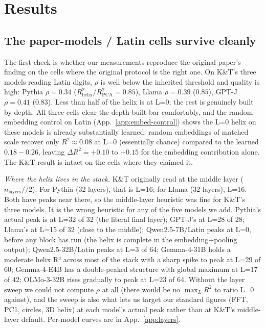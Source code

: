 \documentclass[10pt,letterpaper]{article}
\begin{document}
\section{Results}
\label{sec:results}

\subsection{The paper-models / Latin cells survive cleanly}
\label{sec:results-paper}

The first check is whether our measurements reproduce the original
paper's finding on the cells where the original protocol is the
right one. On K\&T's three models reading Latin digits, $\rho$ is
well below the inherited threshold and quality is high: Pythia
$\rho=0.34$ ($R^2_{\mathrm{helix}}/R^2_{\mathrm{PCA}}=0.85$), Llama
$\rho=0.39$ ($0.85$), GPT-J $\rho=0.41$ ($0.83$). Less than half of
the helix is at L=0; the rest is genuinely built by depth. All
three cells clear the depth-built bar comfortably, and the
random-embedding control on Latin (App.~\ref{app:embed-control})
shows the L=0 helix on these models is already substantially
learned: random embeddings of matched scale recover only $R^2
\approx 0.08$ at L=0 (essentially chance) compared to the learned
$0.18{-}0.26$, leaving $\Delta R^2 = +0.10$ to $+0.15$ for the
embedding contribution alone. The K\&T result is intact on the
cells where they claimed it.

\emph{Where the helix lives in the stack.} K\&T originally read
at the middle layer ($n_{\mathrm{layers}} // 2$). For Pythia (32
layers), that is L=16; for Llama (32 layers), L=16. Both have peaks
near there, so the middle-layer heuristic was fine for K\&T's three
models. It is the wrong heuristic for any of the five models we
add. Pythia's actual peak is at L=32 of 32 (the literal final
layer); GPT-J's at L=28 of 28; Llama's at L=15 of 32 (close to the
middle); Qwen2.5-7B/Latin peaks at L=0, before any block has run
(the helix is complete in the embedding+pooling output);
Qwen2.5-32B/Latin peaks at L=3 of 64; Gemma-4-31B holds a moderate
helix R² across most of the stack with a sharp spike to peak at
L=29 of 60; Gemma-4-E4B has a double-peaked structure with global
maximum at L=17 of 42; OLMo-3-32B rises gradually to peak at L=23
of 64. Without the layer sweep we could not compute $\rho$ at all
(there would be no $\max_L R^2$ to ratio L=0 against), and the
sweep is also what lets us target our standard figures (FFT, PC1,
circles, 3D helix) at each model's actual peak rather than at
K\&T's middle-layer default. Per-model curves are in
App.~\ref{app:layers}.
\end{document}
